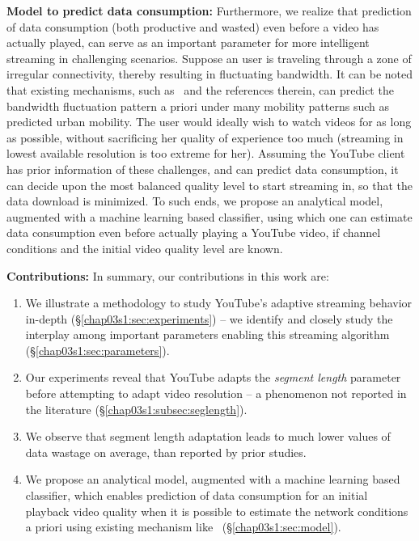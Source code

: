 {\bf Model to predict data consumption:} Furthermore, we realize that prediction of data consumption (both productive and wasted) even before a video has actually played, can serve as an important parameter for more intelligent streaming in challenging scenarios.
Suppose an user is traveling through a zone of irregular connectivity, thereby resulting in fluctuating bandwidth. It can be noted that existing mechanisms, such as~\cite{Zou2015} and the references therein, can predict the bandwidth fluctuation pattern a priori under many mobility patterns such as predicted urban mobility.  
The user would ideally wish to watch videos for as long as possible, without sacrificing her quality of experience too much (streaming in lowest available resolution is too extreme for her). 
Assuming the YouTube client has prior information of these challenges, and can predict data consumption, it can decide upon the most balanced quality level to start streaming in, so that the data download is minimized.
To such ends, we propose an analytical model, augmented with a machine learning based classifier, using which one can estimate data consumption even before actually playing a YouTube video, if channel conditions and the initial video quality level are known.

{\bf Contributions:} In summary, our contributions in this work are:
\begin{enumerate}
	\item We illustrate a methodology to study YouTube's adaptive streaming behavior in-depth (\S\ref{chap03s1:sec:experiments}) -- we identify and closely study the interplay among important parameters enabling this streaming algorithm (\S\ref{chap03s1:sec:parameters}).
	\item Our experiments reveal that YouTube adapts the {\it segment length} parameter before attempting to adapt video resolution -- a phenomenon not reported in the literature (\S\ref{chap03s1:subsec:seglength}).
	\item We observe that segment length adaptation leads to much lower values of data wastage on average, than reported by prior studies.
	\item We propose an analytical model, augmented with a machine learning based classifier, which enables prediction of data consumption for an initial playback video quality when it is possible to estimate the network conditions a priori using existing mechanism like~\cite{Zou2015}  (\S\ref{chap03s1:sec:model}).
\end{enumerate}

